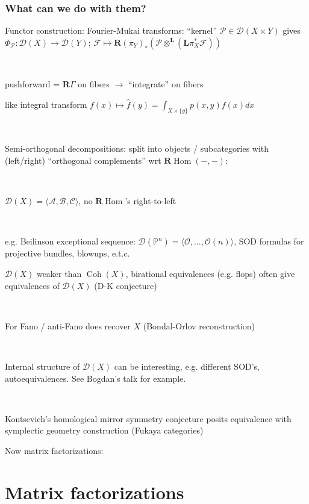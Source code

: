 \documentclass{beamer}
\DeclareMathOperator{\Hom}{Hom}
\DeclareMathOperator{\Coh}{Coh}
\renewcommand{\P}{\mathbb{P}}
\renewcommand{\O}{\mathcal{O}}
\newcommand{\calA}{\mathcal{A}}
\newcommand{\calB}{\mathcal{B}}
\newcommand{\calC}{\mathcal{C}}
\newcommand{\calD}{\mathcal{D}}
\newcommand{\calP}{\mathcal{P}}
\newcommand{\calF}{\mathcal{F}}
\newcommand{\dL}{\mathbf{L}}
\newcommand{\dR}{\mathbf{R}}
\begin{document}
\begin{frame}
    \frametitle{What can we do with them?} \pause

    Functor construction: Fourier-Mukai transforms: ``kernel''
    $\calP\in\calD(X\times Y)$ gives $\Phi_\calP:\calD(X)\to\calD(Y)$;
    $\calF\mapsto\dR(\pi_Y)_*(\calP\otimes^\dL(\dL\pi_X^*\calF))$

    ~

    { \color{gray}
    pushforward = $\dR\Gamma$ on fibers $\to$ ``integrate'' on fibers

    like integral transform
    $f(x)\mapsto\hat f(y)=\int_{X\times\{y\}}p(x,y)f(x)dx$
    } \pause

    ~

    Semi-orthogonal decompositions: split into objects / subcategories with
    (left/right) ``orthogonal complements'' wrt $\dR\Hom(-,-)$:

    ~

    $\calD(X)=\langle\calA,\calB,\calC\rangle$, no $\dR\Hom$'s right-to-left
    \pause

    ~

    e.g. Beilinson exceptional sequence:
    $\calD(\P^n)=\langle\O,\ldots,\O(n)\rangle$, SOD formulas for projective
    bundles, blowups, e.t.c.
\end{frame}

\begin{frame}
    $\calD(X)$ weaker than $\Coh(X)$, birational equivalences (e.g. flops) often
    give equivalences of $\calD(X)$ (D-K conjecture) \pause

    ~

    For Fano / anti-Fano does recover $X$ (Bondal-Orlov reconstruction) \pause

    ~

    Internal structure of $\calD(X)$ can be interesting, e.g. different SOD's,
    autoequivalences. See Bogdan's talk for example. \pause

    ~

    Kontsevich's homological mirror symmetry conjecture posits equivalence with
    symplectic geometry construction (Fukaya categories)
\end{frame}

\begin{frame}
    Now matrix factorizations:
\end{frame}

\section{Matrix factorizations}
\end{document}
